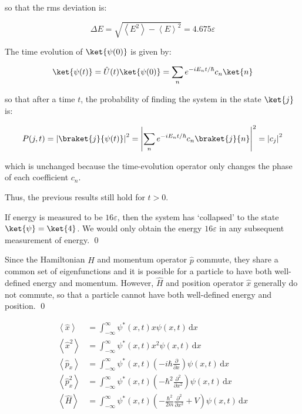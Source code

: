 \documentclass[12pt]{article}
\begin{document}
so that the rms deviation is:

\begin{equation}
    \Delta E = \sqrt{\left\langle E^{2} \right\rangle - \left\langle E \right\rangle^{2}} = 4.675 \varepsilon
\end{equation}

The time evolution of $\ket{\psi(0)}$ is given by:

\begin{equation}
    \ket{\psi(t)} = \hat{U}(t) \ket{\psi(0)} = \sum_{n} e^{-iE_{n}t/\hbar} c_{n} \ket{n}
\end{equation}

so that after a time $t$, the probability of finding the system in the state $\ket{j}$ is:

\begin{equation}
    P(j, t) = \left| \braket{j}{\psi(t)} \right|^{2} = \left| \sum_{n} e^{-iE_{n}t/\hbar} c_{n} \braket{j}{n} \right|^{2} = \left| c_{j} \right|^{2}
\end{equation}

which is unchanged because the time-evolution operator only changes the phase of each coefficient $c_{n}$.

Thus, the previous results still hold for $t > 0$.

If energy is measured to be $16\varepsilon$, then the system has `collapsed' to the state $\ket{\psi} = \ket{4}$. We would only obtain the energy $16\varepsilon$ in any subsequent measurement of energy.
\qed


Since the Hamiltonian $\hat{H}$ and momentum operator $\hat{p}$ commute, they share a common set of eigenfunctions and it is possible for a particle to have both well-defined energy and momentum. However, $\hat{H}$ and position operator $\hat{x}$ generally do not commute, so that a particle cannot have both well-defined energy and position.
\qed



\begin{equation}
\begin{split}
    \left\langle \hat{x} \right\rangle &= \int_{-\infty}^{\infty} \psi^{*}(x,t) x \psi(x,t) \, \mathrm{d}x \\
    \left\langle \hat{x}^{2} \right\rangle &= \int_{-\infty}^{\infty} \psi^{*}(x,t) x^{2} \psi(x,t) \, \mathrm{d}x \\
    \left\langle \hat{p}_{x} \right\rangle &= \int_{-\infty}^{\infty} \psi^{*}(x,t) \left( -i\hbar \frac{\partial}{\partial x} \right) \psi(x,t) \, \mathrm{d}x \\
    \left\langle \hat{p}_{x}^{2} \right\rangle &= \int_{-\infty}^{\infty} \psi^{*}(x,t) \left( -\hbar^{2} \frac{\partial^{2}}{\partial x^{2}} \right) \psi(x,t) \, \mathrm{d}x \\
    \left\langle \hat{H} \right\rangle &= \int_{-\infty}^{\infty} \psi^{*}(x,t) \left( -\frac{\hbar^{2}}{2m} \frac{\partial^{2}}{\partial x^{2}} + V \right) \psi(x,t) \, \mathrm{d}x
\end{split}
\end{equation}
\end{document}
